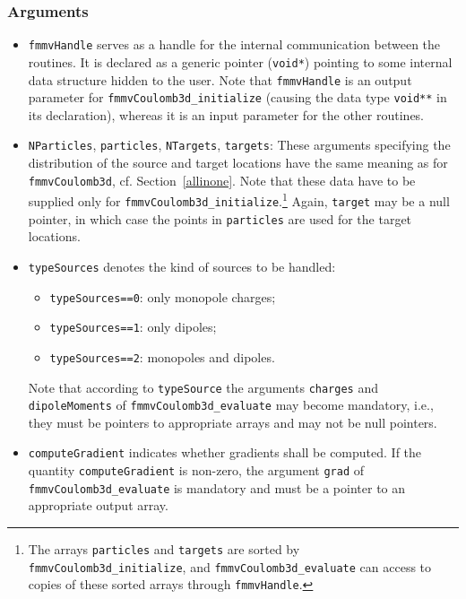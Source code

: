 \subsubsection*{Arguments}
\begin{itemize}
	\item \verb|fmmvHandle| serves as a handle for the 
	internal communication between the routines.
	It is declared as a generic pointer (\verb|void*|) pointing
	to some internal data structure hidden to the user.	
	Note that \verb|fmmvHandle| is an output parameter
	for \verb|fmmvCoulomb3d_initialize| (causing the data type
	\verb|void**| in its declaration), whereas it is an
	input parameter for the other routines.

	\item \verb|NParticles|, \verb|particles|,
	      \verb|NTargets|, \verb|targets|: These arguments specifying
	      the distribution of the source and target locations have the 
	      same meaning as for \verb|fmmvCoulomb3d|, cf. Section~\ref{allinone}.		       Note that these data have to be supplied only for 
	      \verb|fmmvCoulomb3d_initialize|.\footnote{The arrays
	      {\tt particles} and {\tt targets} are sorted
	      by {\tt fmmvCoulomb3d\_initialize}, and {\tt fmmvCoulomb3d\_evaluate}
	      can access to copies of these sorted arrays through {\tt fmmvHandle}.}
	      Again, \verb|target| may be a null pointer, in which case the points
	      in \verb|particles| are used for the target locations.
	      
	\item \verb|typeSources| denotes the kind of sources to be handled:
	\begin{itemize}
	\item[]\verb|typeSources==0|: only monopole charges;
	\item[]\verb|typeSources==1|: only dipoles;
	\item[]\verb|typeSources==2|: monopoles and dipoles.
	\end{itemize}
	Note that according to \verb|typeSource| the arguments
	\verb|charges| and \verb|dipoleMoments| of \verb|fmmvCoulomb3d_evaluate|
	may become mandatory, i.e., they must be pointers to 
	appropriate arrays and may not be null pointers.
	
	\item \verb|computeGradient| indicates whether gradients shall be
	computed. If  the quantity \verb|computeGradient| is non-zero, 
	the argument \verb|grad| of \verb|fmmvCoulomb3d_evaluate| is mandatory
	and must be a pointer to an appropriate output array.
	

\end{itemize}
